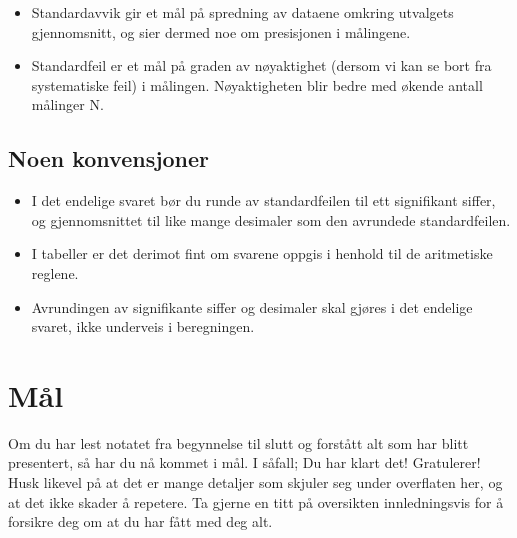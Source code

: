 \documentclass[a4paper,9pt]{article}
\begin{document}
\begin{itemize}
\item Standardavvik gir et mål på spredning av dataene omkring utvalgets gjennomsnitt, og sier dermed noe om presisjonen i målingene.
\item Standardfeil er et mål på graden av nøyaktighet (dersom vi kan se bort fra systematiske feil) i målingen. Nøyaktigheten blir bedre med økende antall målinger N. 
\end{itemize}


\subsection{Noen konvensjoner}

\begin{itemize}
\item I det endelige svaret bør du runde av standardfeilen til ett signifikant siffer, og gjennomsnittet til like mange desimaler som den avrundede standardfeilen.
\item I tabeller er det derimot fint om svarene oppgis i henhold til de aritmetiske reglene.
\item Avrundingen av signifikante siffer og desimaler skal gjøres i det endelige svaret, ikke underveis i beregningen.
\end{itemize}

\section{Mål}

Om du har lest notatet fra begynnelse til slutt og forstått alt som har blitt presentert, så har du nå kommet i mål. I såfall; Du har klart det! Gratulerer! Husk likevel på at det er mange detaljer som skjuler seg under overflaten her, og at det ikke skader å repetere. Ta gjerne en titt på oversikten innledningsvis for å forsikre deg om at du har fått med deg alt.



% 
% 
\end{document}
